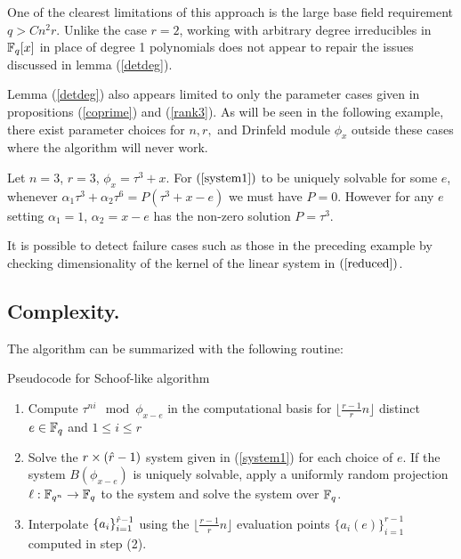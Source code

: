 One of the clearest limitations of this approach is the large base field requirement $q > Cn^2 r$. Unlike the case $r = 2$, working with arbitrary degree irreducibles in $\mathbb{F}_q[x]$ in place of degree 1 polynomials does not appear to repair the issues discussed in lemma (\ref{detdeg}).

Lemma (\ref{detdeg}) also appears limited to only the parameter cases given in propositions (\ref{coprime}) and (\ref{rank3}). As will be seen in the following example, there exist parameter choices for $n, r,$ and Drinfeld module $\phi_x$ outside these cases where the algorithm will never work.

\begin{example}\label{examplefail}
Let $n = 3$, $r =3$, $\phi_x = \tau^3 + x$. For $(\ref{system1})$ to be uniquely solvable for some $e$, whenever $\alpha_1 \tau^3 + \alpha_2 \tau^6 = P (\tau^3 + x - e)$ we must have $P = 0$. However for any $e$ setting $\alpha_1 = 1$, $\alpha_2 = x - e $ has the non-zero solution $P = \tau^3$.  
\end{example}

It is possible to detect failure cases such as those in the preceding example by checking dimensionality of the kernel of the linear system in $(\ref{reduced})$.  



\subsection{Complexity.}

The algorithm can be summarized with the following routine:

\begin{algorithm}[H]\label{schoof}
\caption{Pseudocode for Schoof-like algorithm}
\begin{enumerate}
    \item Compute $\tau^{ni} \mod \phi_{x-e}$ in the computational basis for $\lfloor\frac{r-1}{r}n \rfloor$ distinct $e \in \mathbb{F}_q$ and $1 \leq i \leq r$
    \item Solve the $r \times (\hat{r}-1)$ system given in (\ref{system1}) for each choice of $e$. If the system $B(\phi_{x-e})$ is uniquely solvable, apply a uniformly random projection $\ell : \mathbb{F}_{q^n} \to \mathbb{F}_q$ to the system and solve the system over $\mathbb{F}_q$.
    \item Interpolate $\{a_i\}_{i=1}^{\hat{r}-1}$ using the $\lfloor\frac{r-1}{r}n \rfloor$ evaluation points $\{a_i(e)\}_{i=1}^{r-1}$ computed in step (2). 
    \end{enumerate}
\end{algorithm}

